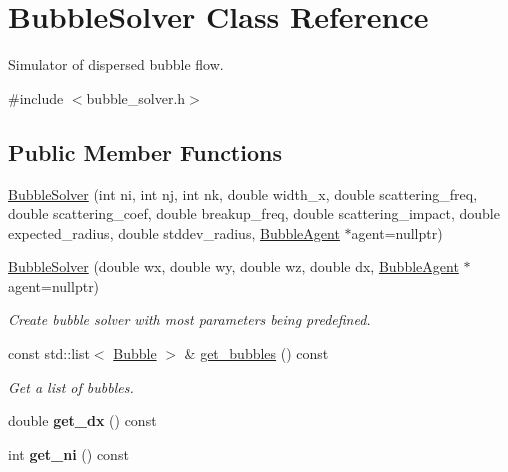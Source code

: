 \hypertarget{class_bubble_solver}{}\section{Bubble\+Solver Class Reference}
\label{class_bubble_solver}


Simulator of dispersed bubble flow.  




{\ttfamily \#include $<$bubble\+\_\+solver.\+h$>$}

\subsection*{Public Member Functions}
\begin{DoxyCompactItemize}
\item 
\hyperlink{class_bubble_solver_a93896970c81c721ee6fbd6989e0090c9}{Bubble\+Solver} (int ni, int nj, int nk, double width\+\_\+x, double scattering\+\_\+freq, double scattering\+\_\+coef, double breakup\+\_\+freq, double scattering\+\_\+impact, double expected\+\_\+radius, double stddev\+\_\+radius, \hyperlink{class_bubble_agent}{Bubble\+Agent} $\ast$agent=nullptr)
\item 
\hyperlink{class_bubble_solver_af0afe26428963124334929d5eadaab37}{Bubble\+Solver} (double wx, double wy, double wz, double dx, \hyperlink{class_bubble_agent}{Bubble\+Agent} $\ast$agent=nullptr)
\begin{DoxyCompactList}\small\item\em Create bubble solver with most parameters being predefined. \end{DoxyCompactList}\item 
\hypertarget{class_bubble_solver_a2f9ca745f73271b0de59936a26450107}{}const std\+::list$<$ \hyperlink{struct_bubble}{Bubble} $>$ \& \hyperlink{class_bubble_solver_a2f9ca745f73271b0de59936a26450107}{get\+\_\+bubbles} () const \label{class_bubble_solver_a2f9ca745f73271b0de59936a26450107}

\begin{DoxyCompactList}\small\item\em Get a list of bubbles. \end{DoxyCompactList}\item 
\hypertarget{class_bubble_solver_a62b6dd926f9000bbe6bfa3cb2f54dd8e}{}double {\bfseries get\+\_\+dx} () const \label{class_bubble_solver_a62b6dd926f9000bbe6bfa3cb2f54dd8e}

\item 
\hypertarget{class_bubble_solver_ae90d580fed7b466e288bcdd5af8a195c}{}int {\bfseries get\+\_\+ni} () const \label{class_bubble_solver_ae90d580fed7b466e288bcdd5af8a195c}


\end{DoxyCompactItemize}
